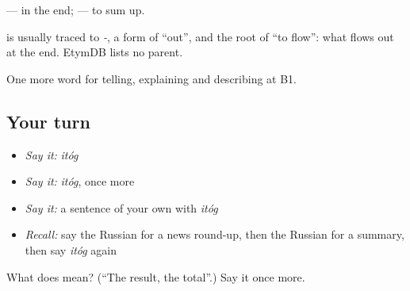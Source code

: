 \emph{ } — in the end; \emph{ } — to sum up.

\begin{cousinweb}
\emph{} is usually traced to \emph{-}, a form of \emph{} \textquotedblleft{}out\textquotedblright{}, and the root of \emph{} \textquotedblleft{}to flow\textquotedblright{}: what flows out at the end. EtymDB lists no parent.
\end{cousinweb}

\begin{grammarlens}[title={What you've built}]
One more word for telling, explaining and describing at B1.
\end{grammarlens}

\subsection*{Your turn}
\begin{itemize}
\raggedright
  \item \emph{Say it:} \emph{itóg}
  \item \emph{Say it:} \emph{itóg}, once more
  \item \emph{Say it:} a sentence of your own with \emph{itóg}
  \item \emph{Recall:} say the Russian for a news round-up, then the Russian for a summary, then say \emph{itóg} again
\end{itemize}

\begin{tcolorbox}[breakable,colback=teal!4,colframe=teal!35!black,title={Before you move on}]
What does  mean? (\textquotedblleft{}The result, the total\textquotedblright{}.) Say it once more.
\end{tcolorbox}
